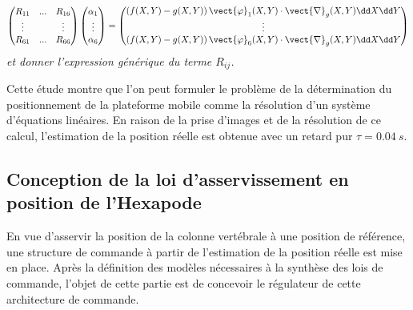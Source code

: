 $$
\begin{pmatrix}
R_{11} & ... & R_{16} \\
\vdots  &     &  \vdots \\
R_{61} & ... & R_{66} \\
\end{pmatrix}
\begin{pmatrix}
\alpha_1 \\
\vdots \\
\alpha_6
\end{pmatrix}
=
\begin{pmatrix}
\left( f(X,Y)-g(X,Y)\right)\vect{\varphi}_1(X,Y)\cdot \vect{\nabla}_g(X,Y) \dd X \dd Y \\
\vdots \\
\left( f(X,Y)-g(X,Y)\right)\vect{\varphi}_6(X,Y)\cdot \vect{\nabla}_g(X,Y) \dd X \dd Y \\
\end{pmatrix}
$$
\textit{et donner l’expression générique du terme $R_{ij}$.}
\ifprof
\begin{corrige}
\end{corrige}
\else
\fi


\ifprof
\begin{corrige}
\end{corrige}
\else
\fi

Cette étude montre que l’on peut formuler le problème de la détermination du positionnement de la plateforme
mobile comme la résolution d’un système d’équations linéaires. En raison de la prise d’images et de la résolution
de ce calcul, l’estimation de la position réelle est obtenue avec un retard pur $\tau = \SI{0,04}{s}$.

\subsection{Conception de la loi d'asservissement en position de l'Hexapode}
\begin{obj}
En vue d’asservir la position de la colonne vertébrale à une position de référence, une structure de
commande à partir de l’estimation de la position réelle est mise en place. Après la définition des
modèles nécessaires à la synthèse des lois de commande, l’objet de cette partie est de concevoir le
régulateur de cette architecture de commande.
\end{obj}


